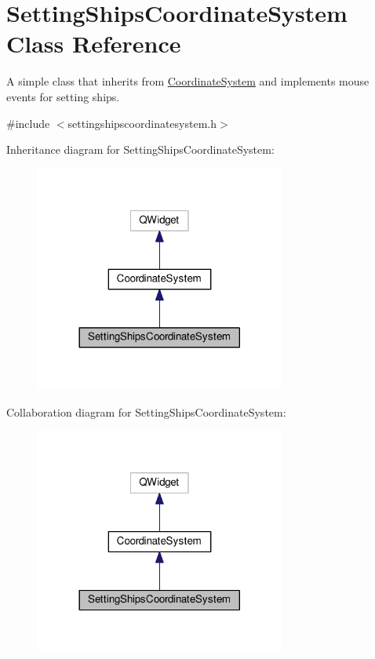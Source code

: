 \hypertarget{classGUI_1_1SettingShipsCoordinateSystem}{}\section{Setting\+Ships\+Coordinate\+System Class Reference}
\label{classGUI_1_1SettingShipsCoordinateSystem}


A simple class that inherits from \hyperlink{classGUI_1_1CoordinateSystem}{Coordinate\+System} and implements mouse events for setting ships.  




{\ttfamily \#include $<$settingshipscoordinatesystem.\+h$>$}



Inheritance diagram for Setting\+Ships\+Coordinate\+System\+:\nopagebreak
\begin{figure}[H]
\begin{center}
\leavevmode
\includegraphics[width=233pt]{classGUI_1_1SettingShipsCoordinateSystem__inherit__graph}
\end{center}
\end{figure}


Collaboration diagram for Setting\+Ships\+Coordinate\+System\+:\nopagebreak
\begin{figure}[H]
\begin{center}
\leavevmode
\includegraphics[width=233pt]{classGUI_1_1SettingShipsCoordinateSystem__coll__graph}
\end{center}
\end{figure}
